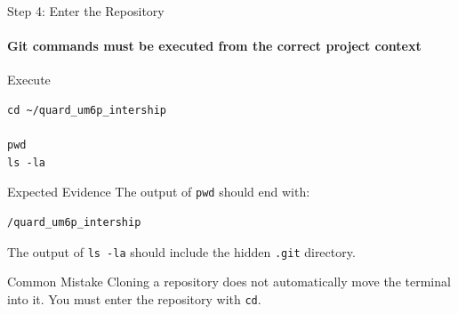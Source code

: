 \begin{frame}[fragile]{Step 4: Enter the Repository}
\framesubtitle{Git commands must be executed from the correct project context}

\footnotesize

\begin{block}{Execute}
\begin{verbatim}
cd ~/quard_um6p_intership

pwd
ls -la
\end{verbatim}
\end{block}

\begin{exampleblock}{Expected Evidence}
The output of \texttt{pwd} should end with:

\begin{verbatim}
/quard_um6p_intership
\end{verbatim}

The output of \texttt{ls -la} should include the hidden
\texttt{.git} directory.
\end{exampleblock}

\begin{alertblock}{Common Mistake}
Cloning a repository does not automatically move the terminal into it.
You must enter the repository with \texttt{cd}.
\end{alertblock}

\end{frame}

